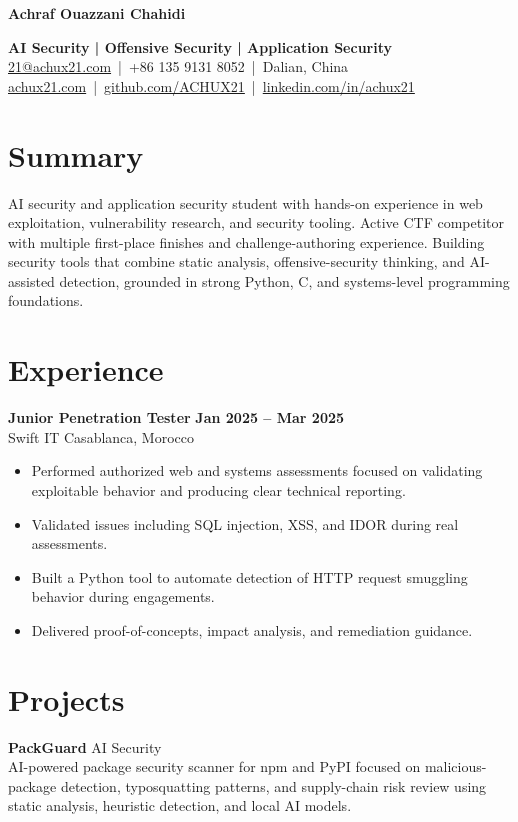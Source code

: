 \documentclass[10pt,letterpaper]{article}
\newcommand{\resumeheader}[1]{
  {\fontsize{22}{24}\selectfont\bfseries\color{resumeblue} #1}
}
\newcommand{\entry}[4]{
  \textbf{#1} \hfill \textbf{#2} \\
  {\color{resumegrey} #3} \hfill {\color{resumegrey} #4} \\
}
\begin{document}
\resumeheader{Achraf Ouazzani Chahidi}

{\color{resumeblue}\textbf{AI Security | Offensive Security | Application Security}} \\
\href{mailto:21@achux21.com}{21@achux21.com} \,|\, +86 135 9131 8052 \,|\, Dalian, China \\
\href{https://achux21.com}{achux21.com} \,|\, \href{https://github.com/ACHUX21}{github.com/ACHUX21} \,|\, \href{https://www.linkedin.com/in/achux21}{linkedin.com/in/achux21}

\section*{Summary}
AI security and application security student with hands-on experience in web exploitation, vulnerability research, and security tooling. Active CTF competitor with multiple first-place finishes and challenge-authoring experience. Building security tools that combine static analysis, offensive-security thinking, and AI-assisted detection, grounded in strong Python, C, and systems-level programming foundations.

\section*{Experience}
\entry{Junior Penetration Tester}{Jan 2025 -- Mar 2025}{Swift IT}{Casablanca, Morocco}
\begin{itemize}
  \item Performed authorized web and systems assessments focused on validating exploitable behavior and producing clear technical reporting.
  \item Validated issues including SQL injection, XSS, and IDOR during real assessments.
  \item Built a Python tool to automate detection of HTTP request smuggling behavior during engagements.
  \item Delivered proof-of-concepts, impact analysis, and remediation guidance.
\end{itemize}

\section*{Projects}
\textbf{PackGuard} \hfill {\color{resumegrey} AI Security} \\
AI-powered package security scanner for npm and PyPI focused on malicious-package detection, typosquatting patterns, and supply-chain risk review using static analysis, heuristic detection, and local AI models.
\end{document}

